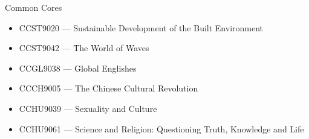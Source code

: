 \documentclass{article}
\begin{document}
Common Cores
\begin{itemize}
    \item[] CCST9020 --- Sustainable Development of the Built Environment
    \item[] CCST9042 --- The World of Waves
    \item[] CCGL9038 --- Global Englishes
    \item[] CCCH9005 --- The Chinese Cultural Revolution
    \item[] CCHU9039 --- Sexuality and Culture
    \item[] CCHU9061 --- Science and Religion: Questioning Truth, Knowledge and Life
\end{itemize}
\end{document}

